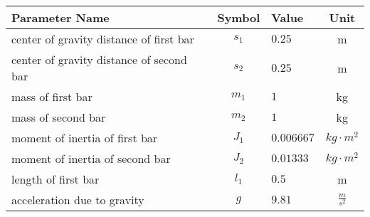 \begin{tabular}{lclc}
\hline
 Parameter Name                           &  Symbol  & Value      &      Unit       \\
\hline
 center of gravity distance of first bar  & $s_{1}$  & $0.25$     &        m        \\
 center of gravity distance of second bar & $s_{2}$  & $0.25$     &        m        \\
 mass of first bar                        & $m_{1}$  & $1$        &       kg        \\
 mass of second bar                       & $m_{2}$  & $1$        &       kg        \\
 moment of inertia of first bar           & $J_{1}$  & $0.006667$ & $kg \cdot m^2$  \\
 moment of inertia of second bar          & $J_{2}$  & $0.01333$  & $kg \cdot m^2$  \\
 length of first bar                      & $l_{1}$  & $0.5$      &        m        \\
 acceleration due to gravity              &   $g$    & $9.81$     & $\frac{m}{s^2}$ \\
\hline
\end{tabular}